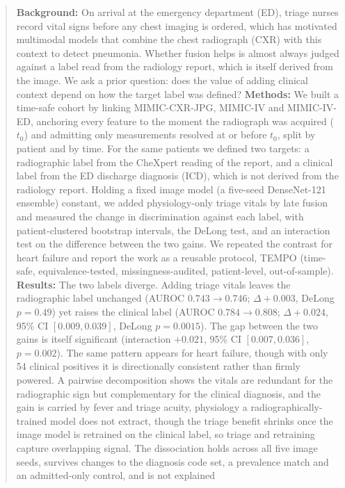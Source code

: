 \documentclass[twocolumn, final]{svjour3}
\begin{document}
\begin{abstract}
\textbf{Background:} On arrival at the emergency department (ED), triage nurses record
vital signs before any chest imaging is ordered, which has motivated multimodal models
that combine the chest radiograph (CXR) with this context to detect pneumonia. Whether
fusion helps is almost always judged against a label read from the radiology report,
which is itself derived from the image. We ask a prior question: does the value of adding
clinical context depend on how the target label was defined?
\textbf{Methods:} We built a time-safe cohort by linking MIMIC-CXR-JPG, MIMIC-IV and
MIMIC-IV-ED, anchoring every feature to the moment the radiograph was acquired ($t_0$)
and admitting only measurements resolved at or before $t_0$, split by patient and by
time. For the same patients we defined two targets: a radiographic label from the
CheXpert reading of the report, and a clinical label from the ED discharge diagnosis
(ICD), which is not derived from the radiology report. Holding a fixed image model (a
five-seed DenseNet-121 ensemble) constant, we added physiology-only triage vitals by late
fusion and measured the change in discrimination against each label, with patient-clustered
bootstrap intervals, the DeLong test, and an interaction test on the difference between the
two gains. We repeated the contrast for heart failure and report the work as
a reusable protocol, TEMPO (time-safe, equivalence-tested, missingness-audited,
patient-level, out-of-sample).
\textbf{Results:} The two labels diverge. Adding triage vitals leaves the
radiographic label unchanged (AUROC $0.743\rightarrow0.746$; $\Delta+0.003$, DeLong
$p{=}0.49$) yet raises the clinical label (AUROC $0.784\rightarrow0.808$; $\Delta+0.024$,
95\% CI $[0.009,0.039]$, DeLong $p{=}0.0015$). The gap between the two gains is itself
significant (interaction $+0.021$, 95\% CI $[0.007,0.036]$, $p{=}0.002$). The same pattern
appears for heart failure, though with only 54 clinical positives it is directionally
consistent rather than firmly powered.
A pairwise decomposition shows the vitals are redundant for the radiographic sign but
complementary for the clinical diagnosis, and the gain is carried by fever and triage
acuity, physiology a radiographically-trained model does not extract, though the triage benefit
shrinks once the image model is retrained on the clinical label, so triage and retraining
capture overlapping signal. The dissociation holds across all five image seeds, survives changes
to the diagnosis code set, a prevalence match and an admitted-only control, and is not explained

\end{abstract}
\end{document}
